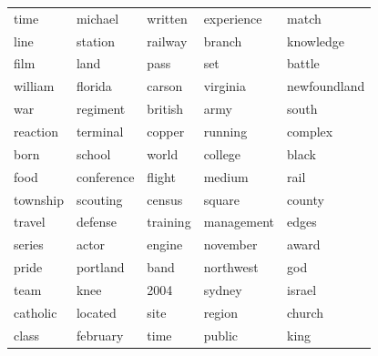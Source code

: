 \begin{table}[ht]
{\begin{tabular}{lllll}
time & michael & written & experience & match \\ 
  line & station & railway & branch & knowledge \\ 
  film & land & pass & set & battle \\ 
  william & florida & carson & virginia & newfoundland \\ 
  war & regiment & british & army & south \\ 
  reaction & terminal & copper & running & complex \\ 
  born & school & world & college & black \\ 
  food & conference & flight & medium & rail \\ 
  township & scouting & census & square & county \\ 
  travel & defense & training & management & edges \\ 
  series & actor & engine & november & award \\ 
  pride & portland & band & northwest & god \\ 
  team & knee & 2004 & sydney & israel \\ 
  catholic & located & site & region & church \\ 
  class & february & time & public & king \\ 
\end{tabular}
}%
\end{table}

